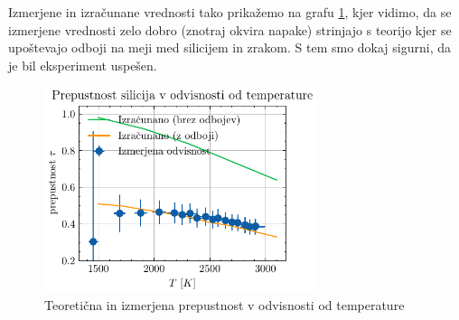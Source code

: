 \documentclass[10pt]{article}
\begin{document}
Izmerjene in izračunane vrednosti tako prikažemo na grafu \ref{končn}, kjer vidimo, da se izmerjene vrednosti zelo dobro (znotraj okvira napake) strinjajo s teorijo kjer se upoštevajo odboji na meji med silicijem in zrakom. S tem smo dokaj sigurni, da je bil eksperiment uspešen.

\begin{figure}[ht]
\begin{center}
    \includegraphics[width=8cm]{prepustnost.pdf}
    \caption{Teoretična in izmerjena prepustnost v odvisnosti od temperature}
    \label{končn}
\end{center}
\end{figure}
\end{document}
